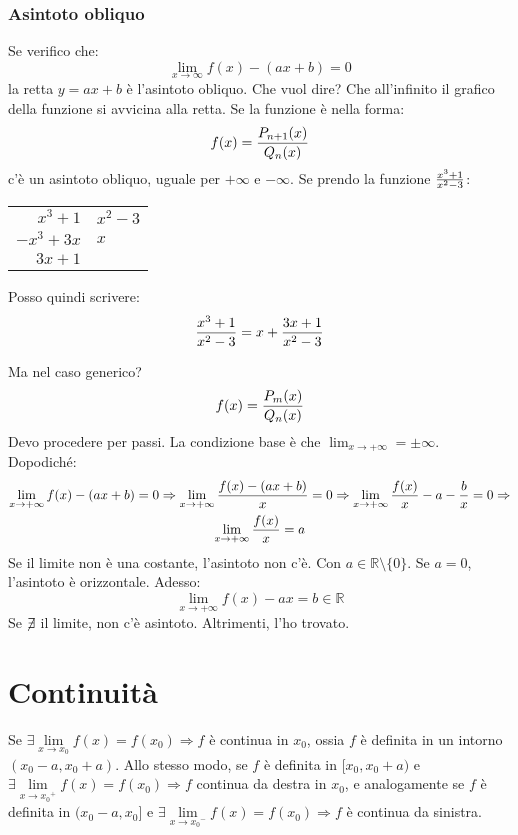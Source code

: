 \documentclass[12pt,a4paper]{article}
\begin{document}
\subsubsection{Asintoto obliquo}
Se verifico che:
$$
\lim_{x \to \infty} f(x) - (ax +b) = 0
$$
la retta $y = ax +b$ \`e l'asintoto obliquo. Che vuol dire? Che all'infinito
il grafico della funzione si avvicina alla retta. Se la funzione \`e nella
forma:
$$
f(x) = {P_{n+1}(x) \over Q_n(x)}
$$
c'\`e un asintoto obliquo, uguale per $+\infty$ e $-\infty$. Se prendo la
funzione ${x^3 +1 \over x^2 -3}$:

\begin{center}
\begin{tabular}{r | l}
$x^3 +1$ & $x^2 -3$ \\ \cline{2-2}
$-x^3 + 3x$ & $x$ \\ \cline{1-1}
$3x+1$ & \\
\end{tabular}
\end{center}

Posso quindi scrivere:
$${x^3 +1 \over x^2 -3} = x + {3x+1 \over x^2 -3}$$

Ma nel caso generico?
$$
f(x) = {P_m(x) \over Q_n(x)}
$$
Devo procedere per passi. La condizione base \`e che $\lim_{x \to +\infty}
= \pm \infty$. Dopodich\'e:
\begin{multline*}
\lim_{x \to +\infty} f(x) - (ax + b) = 0 \Rightarrow
\lim_{x \to +\infty} {f(x) - (ax + b) \over x} = 0 \Rightarrow
\lim_{x \to +\infty} {f(x) \over x} - a - {b \over x} = 0 \Rightarrow \\
\lim_{x \to +\infty} {f(x) \over x} = a
\end{multline*}
Se il limite non \`e una costante, l'asintoto non c'\`e. Con $a \in 
\mathbb{R} \setminus \{ 0 \}$. Se $a = 0$, l'asintoto \`e orizzontale. Adesso:
$$
\lim_{x \to +\infty} f(x) - ax = b \in \mathbb{R}
$$
Se $\centernot \exists$ il limite, non c'\`e asintoto. 
Altrimenti, l'ho trovato.

\newpage
\section{Continuit\`a}

Se $\exists \lim \limits_{x \to x_0} f(x) = f(x_0) \Rightarrow f$ \`e continua
 in $x_0$, ossia $f$ \`e definita in un intorno $(x_0 -a, x_0 + a)$. 
 Allo stesso modo, se $f$ \`e definita in $[x_0, x_0 +a)$ e $\exists \lim 
\limits_{x \to {x_0}^+} f(x) = f(x_0) \Rightarrow f $ continua da destra 
in $x_0$, e analogamente se $f$ \`e definita in $(x_0 -a, x_0]$ e $\exists 
\lim \limits_{x \to {x_0}^-} f(x) = f(x_0) \Rightarrow f $ \`e continua da
sinistra.
\end{document}
